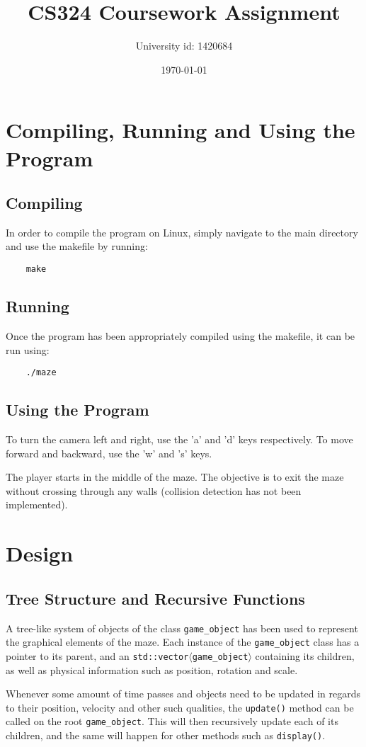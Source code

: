 \documentclass{article}
\title{CS324 Coursework Assignment}
\date{\today}
\author{University id: 1420684}
\begin{document}
	\maketitle
	\newpage
	\section{Compiling, Running and Using the Program}
	\subsection{Compiling}
	In order to compile the program on Linux, simply navigate to the main directory and use the makefile by running:
\begin{lstlisting}
	make
\end{lstlisting}

	\subsection{Running}
Once the program has been appropriately compiled using the makefile, it can be run using:
\begin{lstlisting}
	./maze
\end{lstlisting}

	\subsection{Using the Program}
	To turn the camera left and right, use the 'a' and 'd' keys respectively. To move forward and backward, use the 'w' and 's' keys.
	\par
	The player starts in the middle of the maze. The objective is to exit the maze without crossing through any walls (collision detection has not been implemented).
	
	\newpage
	\section{Design}
	\subsection{Tree Structure and Recursive Functions}
	A tree-like system of objects of the class \texttt{game\_object} has been used to represent the graphical elements of the maze.
	Each instance of the \texttt{game\_object} class has a pointer to its parent, and an \texttt{std::vector$\langle$game\_object$\rangle$} containing its children, as well as physical information such as position, rotation and scale.
	\par
	Whenever some amount of time passes and objects need to be updated in regards to their position, velocity and other such qualities, the \texttt{update()} method can be called on the root \texttt{game\_object}.
	This will then recursively update each of its children, and the same will happen for other methods such as \texttt{display()}.
\end{document}
